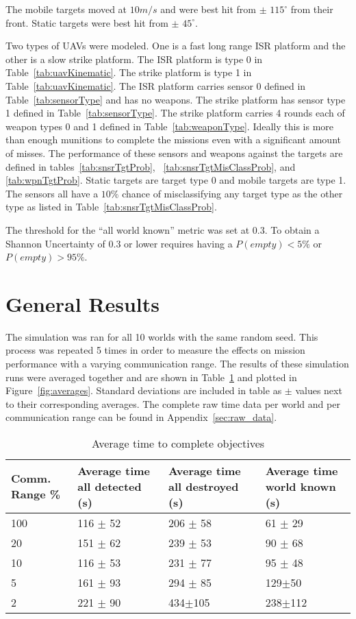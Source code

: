 The mobile targets moved at $10m/s$ and were best hit from $\pm$ $115^{\circ}$ from their front.  Static targets were best hit from $\pm$ $45^{\circ}$.

Two types of UAVs were modeled.  One is a fast long range ISR platform and the other is a slow strike platform.  The ISR platform is type 0 in Table~\ref{tab:uavKinematic}.  The strike platform is type 1 in Table~\ref{tab:uavKinematic}.  The ISR platform carries sensor 0 defined in Table~\ref{tab:sensorType} and has no weapons.  The strike platform has sensor type 1 defined in Table~\ref{tab:sensorType}.  The strike platform carries 4 rounds each of weapon types 0 and 1 defined in Table~\ref{tab:weaponType}.  Ideally this is more than enough munitions to complete the missions even with a significant amount of misses.  The performance of these sensors and weapons against the targets are defined in tables~\ref{tab:snsrTgtProb}, ~\ref{tab:snsrTgtMisClassProb}, and \ref{tab:wpnTgtProb}.  Static targets are target type 0 and mobile targets are type 1.  The sensors all have a $10\%$ chance of misclassifying any target type as the other type as listed in Table~\ref{tab:snsrTgtMisClassProb}.

The threshold for the ``all world known'' metric was set at 0.3. To obtain a Shannon Uncertainty of 0.3 or lower requires having a $P(empty) < 5\%$ or $P(empty) > 95\%$.

\section{General Results}

The simulation was ran for all 10 worlds with the same random seed.  This process was repeated 5 times in order to measure the effects on mission performance with a varying communication range.  The results of these simulation runs were averaged together and are shown in Table~\ref{tab:avgResults} and plotted in Figure~\ref{fig:averages}.  Standard deviations are included in table as $\pm$ values next to their corresponding averages.  The complete raw time data per world and per communication range can be found in Appendix~\ref{sec:raw_data}.


\begin{table}[H]
	\caption{Average time to complete objectives}
	\centering
	\label{tab:avgResults}
	\begin{tabular}{|p{1.1cm}|p{1.75cm}|p{1.75cm}|p{1.5cm}|}
		\hline
		Comm. Range \% & Average time all detected (s) & Average time all destroyed (s) & Average time world known (s)\\
		\hline
		100 & 116 $\pm$ 52 & 206 $\pm$ 58  & 61 $\pm$ 29  \\ \hline
		20  & 151 $\pm$ 62 & 239 $\pm$ 53  & 90 $\pm$ 68  \\ \hline
		10  & 116 $\pm$ 53 & 231 $\pm$ 77  & 95 $\pm$ 48  \\ \hline
		5   & 161 $\pm$ 93 & 294 $\pm$ 85  & 129$\pm$50 \\ \hline
		2   & 221 $\pm$ 90 & 434$\pm$105 & 238$\pm$112 \\ \hline
	\end{tabular}
\end{table}


